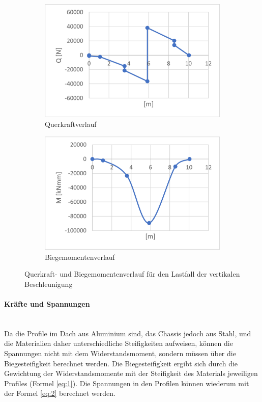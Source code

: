   \begin{figure}[!ht]
    \centering
      \begin{subfigure}{.5\textwidth}
        \centering
        \includegraphics[width=.98\linewidth]{04_figures/1.1 Q.png}
        \caption{Querkraftverlauf}
        \label{1.1 Q}
      \end{subfigure}%
      \begin{subfigure}{.5\textwidth}
        \centering
        \includegraphics[width=.98\linewidth]{04_figures/1.1 M.png}
        \caption{Biegemomentenverlauf}
        \label{1.1 M}
      \end{subfigure}%
    \caption{Querkraft- und Biegemomentenverlauf für den Lastfall der vertikalen Beschleunigung}
  \label{1.1 QM}
  \end{figure}

  \newpage
  \paragraph{Kräfte und Spannungen}\mbox{}\\
  Da die Profile im Dach aus Aluminium sind, das Chassis jedoch aus Stahl, und die Materialien daher unterschiedliche Steifigkeiten aufweisen, können die Spannungen nicht mit dem Widerstandsmoment, sondern müssen über die Biegesteifigkeit berechnet werden. Die Biegesteifigkeit ergibt sich durch die Gewichtung der Widerstandsmomente mit der Steifigkeit des Materials jeweiligen Profiles (Formel \ref{eq:1}). Die Spannungen in den Profilen können wiederum mit der Formel \ref{eq:2} berechnet werden.

